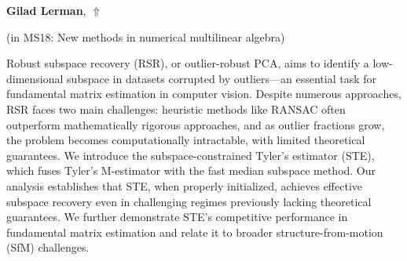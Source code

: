 \documentclass[ILAS2025-program.tex]{subfiles}
\begin{document}
\hypertarget{down0147}{}\begin{ilasabstract}
    
\textbf{Gilad Lerman},  \hfill \hyperlink{up0147}{$\Uparrow$}
    
    
(in {\color{mstitle}MS18: New methods in numerical multilinear algebra})
        
\mtskip
    Robust subspace recovery (RSR), or outlier-robust PCA, aims to identify a low-dimensional subspace in datasets corrupted by outliers—an essential task for fundamental matrix estimation in computer vision. Despite numerous approaches, RSR faces two main challenges: heuristic methods like RANSAC often outperform mathematically rigorous approaches, and as outlier fractions grow, the problem becomes computationally intractable, with limited theoretical guarantees. We introduce the subspace-constrained Tyler's estimator (STE), which fuses Tyler's M-estimator with the fast median subspace method. Our analysis establishes that STE, when properly initialized, achieves effective subspace recovery even in challenging regimes previously lacking theoretical guarantees. We further demonstrate STE's competitive performance in fundamental matrix estimation and relate it to broader structure-from-motion (SfM) challenges. 

\end{ilasabstract}
    
\end{document}
